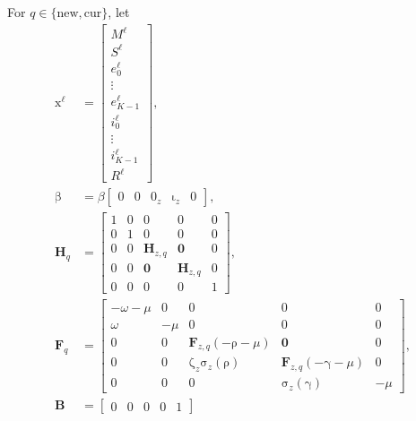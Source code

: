 \documentclass[USenglish]{article}
\renewcommand{\vec}[1]{\boldsymbol{\mathrm{#1}}}
\newcommand{\mat}[1]{\mathbf{#1}}
\begin{document}
For $q \in \{\mathrm{new}, \mathrm{cur}\}$, let
\begin{subequations}
  \begin{align}
    \vec{x}^{\ell} &=
    \begin{bmatrix}
      M^{\ell} \\
      S^{\ell} \\
      e_0^{\ell} \\ \vdots \\ e_{K - 1}^{\ell} \\
      i_0^{\ell} \\ \vdots \\ i_{K - 1}^{\ell} \\
      R^{\ell}
    \end{bmatrix},
    \\
    \vec{\beta} &=
    \beta
    \begin{bmatrix}
      0 & 0 & \vec{0}_z & \vec{\iota}_z & 0
    \end{bmatrix},
    \\
    \mat{H}_{q} &=
    \begin{bmatrix}
      1 & 0 & \vec{0} & \vec{0} & 0 \\
      0 & 1 & \vec{0} & \vec{0} & 0 \\
      \vec{0} & \vec{0} & \mat{H}_{z, q} & \mat{0} & \vec{0} \\
      \vec{0} & \vec{0} & \mat{0} & \mat{H}_{z, q} & \vec{0}
      \\
      0 & 0 & \vec{0} & \vec{0} & 1
    \end{bmatrix},
    \\
    \mat{F}_q &=
    \begin{bmatrix}
      - \omega - \mu & 0 & \vec{0} & \vec{0} & 0
      \\
      \omega & - \mu & \vec{0} & \vec{0} & 0
      \\
      \vec{0} & \vec{0} & \mat{F}_{z, q}(- \vec{\rho} - \mu)
      & \mat{0} & \vec{0}
      \\
      \vec{0} & \vec{0} & \vec{\zeta}_z \vec{\sigma}_z(\vec{\rho})
      & \mat{F}_{z, q}(- \vec{\gamma} - \mu) & \vec{0}
      \\
      0 & 0 & \vec{0} & \vec{\sigma}_z(\vec{\gamma}) & - \mu
    \end{bmatrix},
    \\
    \mat{B} &=
    \begin{bmatrix}
      0 & 0 & \vec{0} & \vec{0} & 1

\end{bmatrix}
\end{align}
\end{subequations}
\end{document}
